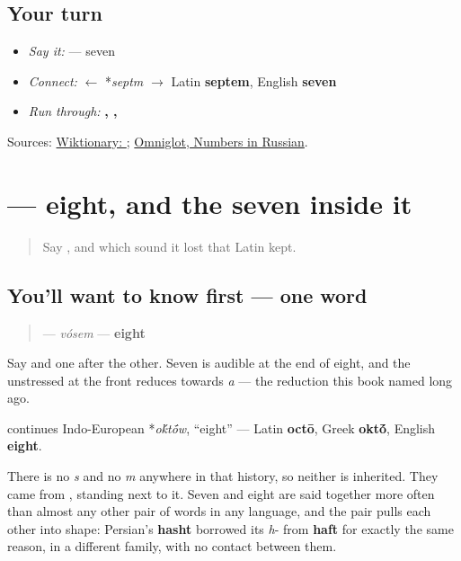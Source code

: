 \subsection*{Your turn}
\begin{itemize}
\raggedright
  \item \emph{Say it:} \textbf{} — seven
  \item \emph{Connect:} \textbf{} $\leftarrow$ *\emph{septm} $\to$ Latin \textbf{septem}, English \textbf{seven}
  \item \emph{Run through:} \textbf{, , }
\end{itemize}

\begin{tcolorbox}[breakable,colback=teal!4,colframe=teal!35!black,title={Before you move on}]
Sources: \href{https://en.wiktionary.org/wiki/\%D1\%81\%D0\%B5\%D0\%BC\%D1\%8C}{Wiktionary: }; \href{https://www.omniglot.com/language/numbers/russian.htm}{Omniglot, Numbers in Russian}.
\end{tcolorbox}
\section[\texorpdfstring{\ru{восемь} (vósem)}{восемь (vósem)}]{ — eight, and the seven inside it}

\label{lesson:RU-C24-vosem}



\begin{quote}
Say \textbf{}, and which sound it lost that Latin kept.
\end{quote}

\subsection*{You'll want to know first — one word}
\begin{quote}
\textbf{} — \emph{vósem} — \textbf{eight}
\end{quote}

Say \textbf{} and \textbf{} one after the other. Seven is audible at the end of eight, and the unstressed \textbf{} at the front reduces towards \emph{a} — the reduction this book named long ago.

\begin{cousinweb}
\textbf{} continues Indo-European *\emph{o\'{k}t\'{\={o}}w}, \textquotedblleft{}eight\textquotedblright{} — Latin \textbf{octō}, Greek \textbf{okt\'{\={o}}}, English \textbf{eight}.

There is no \emph{s} and no \emph{m} anywhere in that history, so neither is inherited. They came from \textbf{}, standing next to it. Seven and eight are said together more often than almost any other pair of words in any language, and the pair pulls each other into shape: Persian's \textbf{hasht} borrowed its \emph{h}- from \textbf{haft} for exactly the same reason, in a different family, with no contact between them.
\end{cousinweb}

